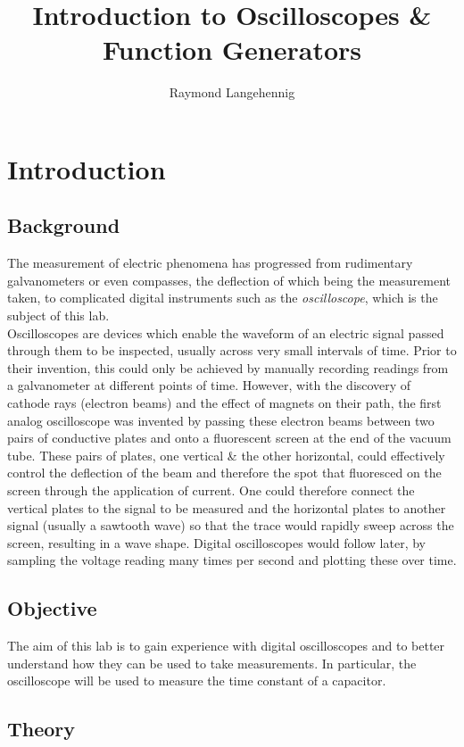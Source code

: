 \documentclass{article}
\title{Introduction to Oscilloscopes \& Function Generators}
\author{Raymond Langehennig}
\begin{document}
\maketitle

\section{Introduction}
    \subsection{Background}
        The measurement of electric phenomena has progressed from rudimentary galvanometers or even compasses, the deflection of which being the measurement taken, to complicated digital instruments such as the \emph{oscilloscope}, which is the subject of this lab.\\
        Oscilloscopes are devices which enable the waveform of an electric signal passed through them to be inspected, usually across very small intervals of time. Prior to their invention, this could only be achieved by manually recording readings from a galvanometer at different points of time. However, with the discovery of cathode rays (electron beams) and the effect of magnets on their path, the first analog oscilloscope was invented by passing these electron beams between two pairs of conductive plates and onto a fluorescent screen at the end of the vacuum tube. These pairs of plates, one vertical \& the other horizontal, could effectively control the deflection of the beam and therefore the spot that fluoresced on the screen through the application of current. One could therefore connect the vertical plates to the signal to be measured and the horizontal plates to another signal (usually a sawtooth wave) so that the trace would rapidly sweep across the screen, resulting in a wave shape. Digital oscilloscopes would follow later, by sampling the voltage reading many times per second and plotting these over time.

    \subsection{Objective}
    The aim of this lab is to gain experience with digital oscilloscopes and to better understand how they can be used to take measurements. In particular, the oscilloscope will be used to measure the time constant of a capacitor.

    \subsection{Theory}\label{theory}
    
\end{document}
